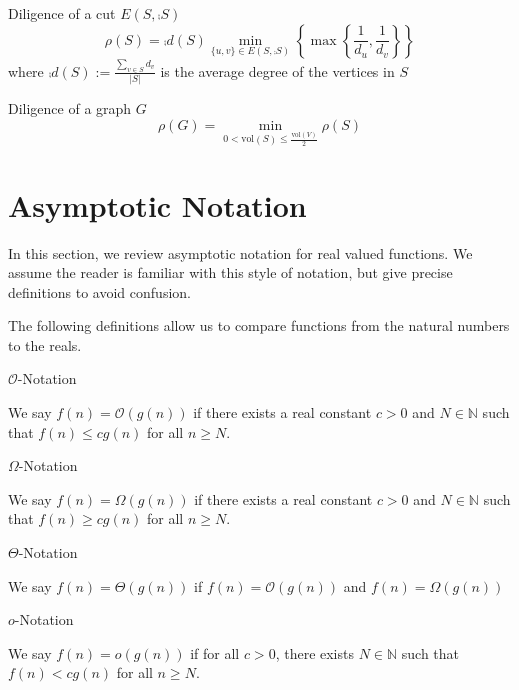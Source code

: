 \begin{definition}
	Diligence of a cut $ E(S, \comp{S}) $
	$$
		\rho(S) = \comp{d}(S) \min_{\{u, v\} \in E(S, \comp{S}) } \left\{ \max \left\{ \frac{1}{d_u},\frac{1}{d_v} \right\} \right\}
	$$ 
	where $\comp{d}(S) := \frac{\sum_{v \in S} d_v}{|S|}$ is the average degree of the vertices in $S$
\end{definition}

\begin{definition} %
	Diligence of a graph $G$
	$$
		\rho(G) = \min_{0 < \text{vol}(S) \leq \frac{\text{vol}(V)}{2}} \rho(S) 
	$$
\end{definition}

\section{Asymptotic Notation}

In this section, we review asymptotic notation for real valued functions. We assume the reader is familiar with this style of notation, but give precise definitions to avoid confusion. %

The following definitions allow us to compare functions from the natural numbers to the reals.

\begin{definition}
	$\mathcal{O}$-Notation

	\noindent
	We say $f(n) = \mathcal{O}(g(n))$ if there exists a real constant $c > 0$ and $N \in \mathbb{N}$ such that $f(n) \leq c g(n)$ for all $n \geq N$. 
\end{definition}

\begin{definition}
	$\Omega$-Notation

	\noindent
	We say $f(n) = \Omega(g(n))$ if there exists a real constant $c > 0$ and $N \in \mathbb{N}$ such that $f(n) \geq c g(n)$ for all $n \geq N$. 
\end{definition}

\begin{definition}
	$\Theta$-Notation

	\noindent
	We say $f(n) = \Theta(g(n))$ if $f(n) = \mathcal{O}(g(n))$ and $f(n) = \Omega(g(n))$
\end{definition}


\begin{definition}
	$o$-Notation

	\noindent
	We say $f(n) = o(g(n))$ if for all $c > 0$, there exists $N \in \mathbb{N}$ such that $f(n) < c g(n)$ for all $n \geq N$.
\end{definition}

